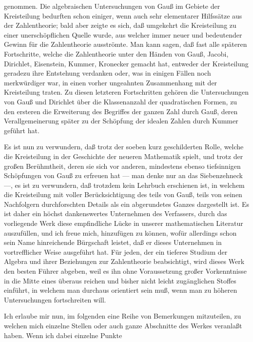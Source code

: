 \documentclass[11pt]{article}
\newcommand{\origpage}[1]{\par\vspace{0.25em}\noindent{\footnotesize\itshape [Gedruckte Seite #1]}\par\vspace{0.25em}}
\begin{document}
\origpage{410}
genommen. Die algebraischen Untersuchungen von Gauß im Gebiete der Kreisteilung bedurften schon einiger, wenn auch sehr elementarer Hilfssätze aus der Zahlentheorie; bald aber zeigte es sich, daß umgekehrt die Kreisteilung zu einer unerschöpflichen Quelle wurde, aus welcher immer neuer und bedeutender Gewinn für die Zahlentheorie ausströmte. Man kann sagen, daß fast alle späteren Fortschritte, welche die Zahlentheorie unter den Händen von Gauß, Jacobi, Dirichlet, Eisenstein, Kummer, Kronecker gemacht hat, entweder der Kreisteilung geradezu ihre Entstehung verdanken oder, was in einigen Fällen noch merkwürdiger war, in einen vorher ungeahnten Zusammenhang mit der Kreisteilung traten. Zu diesen letzteren Fortschritten gehören die Untersuchungen von Gauß und Dirichlet über die Klassenanzahl der quadratischen Formen, zu den ersteren die Erweiterung des Begriffes der ganzen Zahl durch Gauß, deren Verallgemeinerung später zu der Schöpfung der idealen Zahlen durch Kummer geführt hat.

Es ist nun zu verwundern, daß trotz der soeben kurz geschilderten Rolle, welche die Kreisteilung in der Geschichte der neueren Mathematik spielt, und trotz der großen Berühmtheit, deren sie sich vor anderen, mindestens ebenso tiefsinnigen Schöpfungen von Gauß zu erfreuen hat --- man denke nur an das Siebenzehneck ---, es ist zu verwundern, daß trotzdem kein Lehrbuch erschienen ist, in welchem die Kreisteilung mit voller Berücksichtigung des teils von Gauß, teils von seinen Nachfolgern durchforschten Details als ein abgerundetes Ganzes dargestellt ist. Es ist daher ein höchst dankenswertes Unternehmen des Verfassers, durch das vorliegende Werk diese empfindliche Lücke in unserer mathematischen Literatur auszufüllen, und ich freue mich, hinzufügen zu können, wofür allerdings schon sein Name hinreichende Bürgschaft leistet, daß er dieses Unternehmen in vortrefflicher Weise ausgeführt hat. Für jeden, der ein tieferes Studium der Algebra und ihrer Beziehungen zur Zahlentheorie beabsichtigt, wird dieses Werk den besten Führer abgeben, weil es ihn ohne Voraussetzung großer Vorkenntnisse in die Mitte eines überaus reichen und bisher nicht leicht zugänglichen Stoffes einführt, in welchem man durchaus orientiert sein muß, wenn man zu höheren Untersuchungen fortschreiten will.

Ich erlaube mir nun, im folgenden eine Reihe von Bemerkungen mitzuteilen, zu welchen mich einzelne Stellen oder auch ganze Abschnitte des Werkes veranlaßt haben. Wenn ich dabei einzelne Punkte
\end{document}
